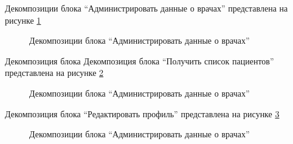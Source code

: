         Декомпозиции блока “Администрировать данные о врачах” представлена на рисунке \ref{context-doctor-admin}

        \begin{figure}[H]%
            \centering
            \caption{Декомпозиции блока “Администрировать данные о врачах”} \label{context-doctor-admin}
        \end{figure} 

        Декомпозиция блока Декомпозиция блока “Получить список пациентов” представлена на рисунке \ref{context-patient-list}

        \begin{figure}[H]%
            \centering
            \caption{Декомпозиции блока “Администрировать данные о врачах”} \label{context-patient-list}
        \end{figure} 
        
        Декомпозиция блока “Редактировать профиль” представлена на рисунке \ref{context-change-profile}

        \begin{figure}[H]%
            \centering
            \caption{Декомпозиции блока “Администрировать данные о врачах”} \label{context-change-profile}
        \end{figure} 